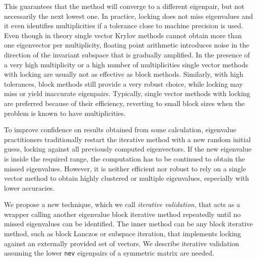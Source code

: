 \documentclass{report}
\begin{document}
This guarantees that the method will converge to a different eigenpair,
but not necessarily the next lowest one.
In practice, locking does not miss eigenvalues and it even identifies
multiplicities if a tolerance close to machine precision is used.
Even though in theory single vector Krylov methods cannot obtain
more than one eigenvector per multiplicity, floating point arithmetic
introduces noise in the direction of the invariant subspace
that is gradually amplified.
In the presence of a very high multiplicity or a high number of multiplicities
single vector methods with locking are usually not as effective as
block methods.
Similarly, with high tolerances, block methods still provide a very
robust choice, while locking may miss or yield inaccurate eigenpairs.
Typically, single vector methods with locking are preferred because of
their efficiency, reverting to small block sizes when the problem is
known to have multiplicities.


To improve confidence on results obtained from some calculation,
eigenvalue practitioners traditionally restart the iterative method
with a new random initial guess, locking against all previously computed
eigenvectors.
If the new eigenvalue is inside the required range, the computation has
to be continued to obtain the missed eigenvalues.
However, it is neither efficient nor robust to rely on a single
vector method to obtain highly clustered or multiple eigenvalues, especially
with lower accuracies.

We propose a new technique, which we call {\it iterative validation},
that acts as a wrapper calling another eigenvalue block iterative method
repeatedly until no missed eigenvalues can be identified.
The inner method can be any block iterative method, such as
block Lanczos or subspace iteration, that implements locking against
an externally provided set of vectors.
We describe iterative validation assuming the lower {\tt nev}
eigenpairs of a symmetric matrix are needed.
\end{document}
